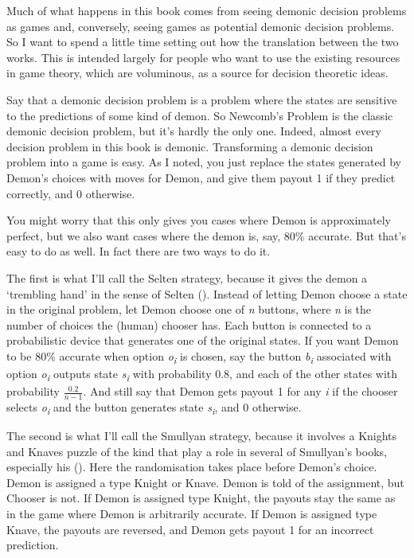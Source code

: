 \documentclass[
  12pt,
  letterpaper,
  DIV=11,
  numbers=noendperiod]{scrreprt}
\begin{document}
Much of what happens in this book comes from seeing demonic decision
problems as games and, conversely, seeing games as potential demonic
decision problems. So I want to spend a little time setting out how the
translation between the two works. This is intended largely for people
who want to use the existing resources in game theory, which are
voluminous, as a source for decision theoretic ideas.

Say that a demonic decision problem is a problem where the states are
sensitive to the predictions of some kind of demon. So Newcomb's Problem
is the classic demonic decision problem, but it's hardly the only one.
Indeed, almost every decision problem in this book is demonic.
Transforming a demonic decision problem into a game is easy. As I noted,
you just replace the states generated by Demon's choices with moves for
Demon, and give them payout 1 if they predict correctly, and 0
otherwise.

You might worry that this only gives you cases where Demon is
approximately perfect, but we also want cases where the demon is, say,
80\% accurate. But that's easy to do as well. In fact there are two ways
to do it.

The first is what I'll call the Selten strategy, because it gives the
demon a `trembling hand' in the sense of Selten
(). Instead of letting Demon choose a
state in the original problem, let Demon choose one of \emph{n} buttons,
where \emph{n} is the number of choices the (human) chooser has. Each
button is connected to a probabilistic device that generates one of the
original states. If you want Demon to be 80\% accurate when option
\emph{o\textsubscript{i}} is chosen, say the button
\emph{b\textsubscript{i}} associated with option
\emph{o\textsubscript{i}} outputs state \emph{s\textsubscript{i}} with
probability 0.8, and each of the other states with probability
\(\frac{0.2}{n - 1}\). And still say that Demon gets payout 1 for any
\emph{i} if the chooser selects \emph{o\textsubscript{i}} and the button
generates state \emph{s\textsubscript{i}}, and 0 otherwise.

The second is what I'll call the Smullyan strategy, because it involves
a Knights and Knaves puzzle of the kind that play a role in several of
Smullyan's books, especially his ().
Here the randomisation takes place before Demon's choice. Demon is
assigned a type Knight or Knave. Demon is told of the assignment, but
Chooser is not. If Demon is assigned type Knight, the payouts stay the
same as in the game where Demon is arbitrarily accurate. If Demon is
assigned type Knave, the payouts are reversed, and Demon gets payout 1
for an incorrect prediction.
\end{document}
